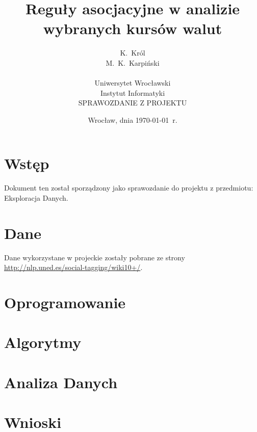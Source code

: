 \documentclass[a4paper,12pt]{article}
\title{Reguły asocjacyjne w analizie wybranych kursów walut}
\author{K.~Król\\
M.~K.~Karpiński\\
\\
Uniwersytet Wrocławski\\
Instytut Informatyki\\
SPRAWOZDANIE Z PROJEKTU}
\date{Wrocław, dnia \today\ r.}
\begin{document}
\thispagestyle{empty}
\maketitle

\newpage

\tableofcontents

\newpage



\section{Wstęp}
\indent \indent Dokument ten został sporządzony jako sprawozdanie do projektu z przedmiotu: Eksploracja Danych.

\section{Dane}

\indent \indent Dane wykorzystane w projeckie zostały pobrane ze strony \url{http://nlp.uned.es/social-tagging/wiki10+/}.
\section{Oprogramowanie}

\section{Algorytmy}

\section{Analiza Danych}

\section{Wnioski}
\end{document}
